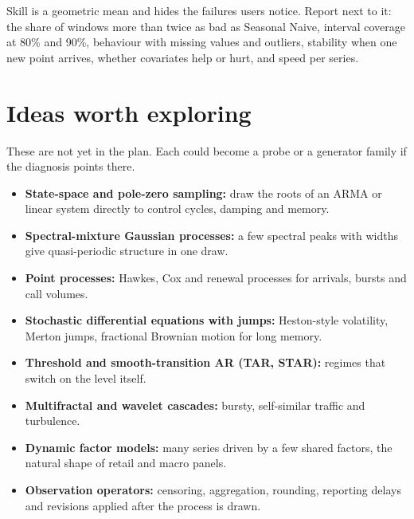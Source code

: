 \documentclass[10pt,a4paper]{article}
\begin{document}
\begin{keep}
Skill is a geometric mean and hides the failures users notice. Report next to it: the share of windows more than twice as bad as Seasonal Naive, interval coverage at 80\% and 90\%, behaviour with missing values and outliers, stability when one new point arrives, whether covariates help or hurt, and speed per series.
\end{keep}

\section{Ideas worth exploring}

These are not yet in the plan. Each could become a probe or a generator family if the diagnosis points there.

\begin{explore}
\begin{itemize}
\item \textbf{State-space and pole-zero sampling:} draw the roots of an ARMA or linear system directly to control cycles, damping and memory.
\item \textbf{Spectral-mixture Gaussian processes:} a few spectral peaks with widths give quasi-periodic structure in one draw.
\item \textbf{Point processes:} Hawkes, Cox and renewal processes for arrivals, bursts and call volumes.
\item \textbf{Stochastic differential equations with jumps:} Heston-style volatility, Merton jumps, fractional Brownian motion for long memory.
\item \textbf{Threshold and smooth-transition AR (TAR, STAR):} regimes that switch on the level itself.
\item \textbf{Multifractal and wavelet cascades:} bursty, self-similar traffic and turbulence.
\item \textbf{Dynamic factor models:} many series driven by a few shared factors, the natural shape of retail and macro panels.
\item \textbf{Observation operators:} censoring, aggregation, rounding, reporting delays and revisions applied after the process is drawn.
\end{itemize}
\end{explore}
\end{document}
